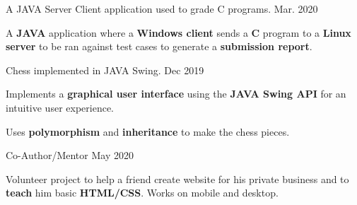 \begin{cventries}
  \cventry
    {A JAVA Server Client application used to grade C programs.} %
    {\href{https://github.com/MattBelanger321/CodeGrader}{}}
    {Mar. 2020} %
    {} %
    {
      \begin{cvitems} %
        \item {A \textbf{JAVA} application where a \textbf{Windows client} sends a \textbf{C} program to a \textbf{Linux server} to be ran against test cases to generate a \textbf{submission report}.}
      \end{cvitems}
    }
   
  \cventry
    {Chess implemented in JAVA Swing.} %
    {\href{https://github.com/MattBelanger321/Chess}{}} %
    {Dec 2019} %
    {} %
    {
      \begin{cvitems} %
        \item {Implements a \textbf{graphical user interface} using the \textbf{JAVA Swing API} for an intuitive user experience.}
        \item {Uses \textbf{polymorphism} and \textbf{inheritance} to make the chess pieces.}
      \end{cvitems}
    }

  \cventry
    {Co-Author/Mentor} %
    {\href{https://bennixmusic.github.io}{}}  %
    {May 2020} %
    {}
    {
      \begin{cvitems} %
        \item {Volunteer project to help a friend create website for his private business and to \textbf{teach} him basic \textbf{HTML/CSS}. Works on mobile and desktop.}
      \end{cvitems}
    }

\end{cventries}
